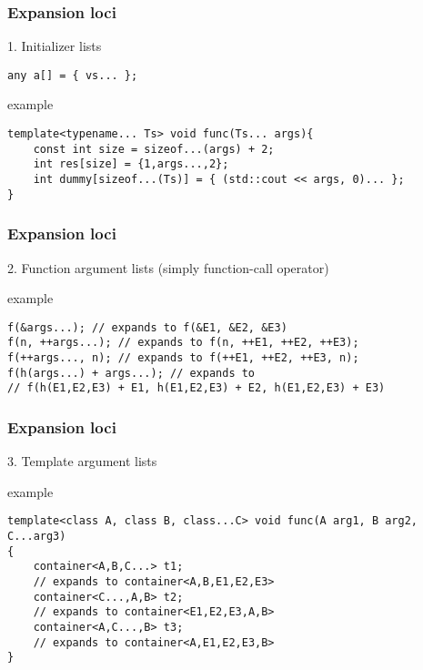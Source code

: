 \documentclass{beamer}
\begin{document}
\begin{frame}[fragile]
\frametitle{Expansion loci }

1. Initializer lists

\begin{lstlisting}
any a[] = { vs... };
\end{lstlisting}

\begin{block}{example}
\begin{lstlisting}
template<typename... Ts> void func(Ts... args){
    const int size = sizeof...(args) + 2;
    int res[size] = {1,args...,2};
    int dummy[sizeof...(Ts)] = { (std::cout << args, 0)... };
}
\end{lstlisting}
\end{block}

\end{frame}


\begin{frame}[fragile]
\frametitle{Expansion loci }

2. Function argument lists (simply function-call operator)

\begin{block}{example}
\begin{lstlisting}
f(&args...); // expands to f(&E1, &E2, &E3)
f(n, ++args...); // expands to f(n, ++E1, ++E2, ++E3);
f(++args..., n); // expands to f(++E1, ++E2, ++E3, n);
f(h(args...) + args...); // expands to 
// f(h(E1,E2,E3) + E1, h(E1,E2,E3) + E2, h(E1,E2,E3) + E3)
\end{lstlisting}
\end{block}

\end{frame}

\begin{frame}[fragile]
\frametitle{Expansion loci }

3. Template argument lists

\begin{block}{example}
\begin{lstlisting}
template<class A, class B, class...C> void func(A arg1, B arg2, C...arg3)
{
    container<A,B,C...> t1;  
    // expands to container<A,B,E1,E2,E3> 
    container<C...,A,B> t2;  
    // expands to container<E1,E2,E3,A,B> 
    container<A,C...,B> t3;  
    // expands to container<A,E1,E2,E3,B> 
}
\end{lstlisting}
\end{block}

\end{frame}
\end{document}
